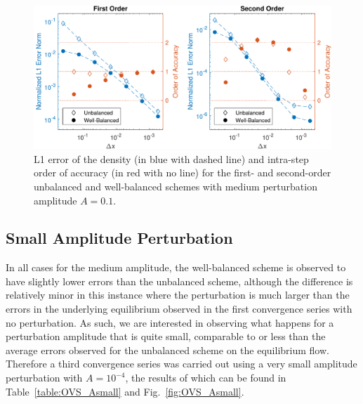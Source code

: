 \begin {figure}
\centering
\includegraphics[width=13cm]{figures/OVSeps0_1}
\caption {L1 error of the density (in blue with dashed line) and intra-step order of accuracy (in red with no line) for the first- and second-order unbalanced and well-balanced schemes with medium perturbation amplitude $A=0.1$.}
\label{fig:OVS_Amedium}
\end{figure}

\subsection{Small Amplitude Perturbation}

In all cases for the medium amplitude, the well-balanced scheme is observed to have slightly lower errors than the unbalanced scheme, although the difference is relatively minor in this instance where the perturbation is much larger than the errors in the underlying equilibrium observed in the first convergence series with no perturbation. As such, we are interested in observing what happens for a perturbation amplitude that is quite small, comparable to or less than the average errors observed for the unbalanced scheme on the equilibrium flow. Therefore a third convergence series was carried out using a very small amplitude perturbation with $A=10^{-4}$, the results of which can be found in Table~\ref{table:OVS_Asmall} and Fig.~\ref{fig:OVS_Asmall}.

